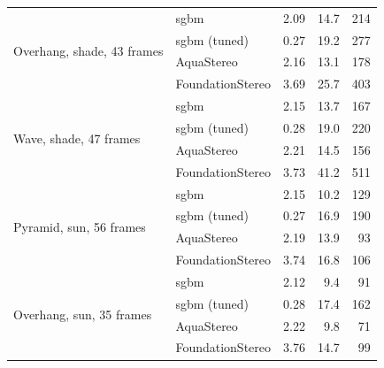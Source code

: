 \begin{table}[H]
\begin{tabular}{llrrr}
\midrule
\multirow{4}{*}{Overhang, shade, 43 frames} & \acrshort{sgbm}             & 2.09 & 14.7 & 214 \\
                                            & \acrshort{sgbm} (tuned)     & 0.27 & 19.2 & 277 \\
                                            & AquaStereo       & 2.16 & 13.1 & 178 \\
                                            & FoundationStereo & 3.69 & 25.7 & 403 \\
\midrule
\multirow{4}{*}{Wave, shade, 47 frames} & \acrshort{sgbm}             & 2.15 & 13.7 & 167 \\
                                        & \acrshort{sgbm} (tuned)     & 0.28 & 19.0 & 220 \\
                                        & AquaStereo       & 2.21 & 14.5 & 156 \\
                                        & FoundationStereo & 3.73 & 41.2 & 511 \\
\midrule
\multirow{4}{*}{Pyramid, sun, 56 frames} & \acrshort{sgbm}             & 2.15 & 10.2 & 129 \\
                                         & \acrshort{sgbm} (tuned)     & 0.27 & 16.9 & 190 \\
                                         & AquaStereo       & 2.19 & 13.9 & 93 \\
                                         & FoundationStereo & 3.74 & 16.8 & 106 \\
\midrule
\multirow{4}{*}{Overhang, sun, 35 frames} & \acrshort{sgbm}             & 2.12 & 9.4  & 91 \\
                                          & \acrshort{sgbm} (tuned)     & 0.28 & 17.4 & 162 \\
                                          & AquaStereo       & 2.22 & 9.8  & 71 \\
                                          & FoundationStereo & 3.76 & 14.7 & 99 \\
\bottomrule
\end{tabular}
\end{table}

